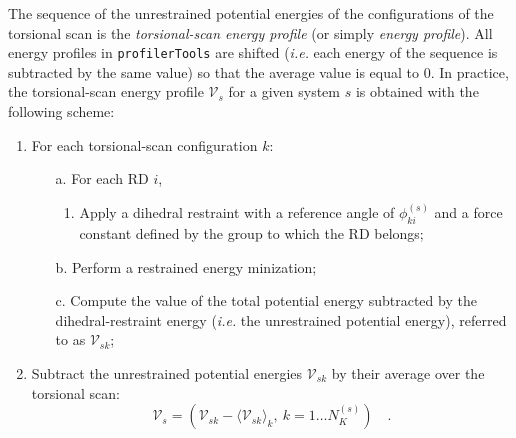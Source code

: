 \documentclass[10pt,a4paper,openany]{memoir}
\numberwithin{equation}{section}
\newcommand{\profilertools}[0]{\texttt{profilerTools}}
\begin{document}
The sequence of the unrestrained potential energies of the
configurations of the torsional scan is the \textit{torsional-scan
  energy profile} (or simply \textit{energy profile}).  All energy
profiles in \profilertools{} are shifted (\textit{i.e.} each energy of
the sequence is subtracted by the same value) so that the average
value is equal to 0.
In practice, the torsional-scan energy profile $\mathcal{V}_s$ for a
given system $s$ is obtained with the following scheme:
\begin{enumerate}
\item For each torsional-scan configuration $k$:
  \begin{enumerate}
  \item[a.] For each RD $i$,
    \begin{enumerate}
    \item Apply a dihedral restraint with a reference angle of
      $\phi_{ki}^{(s)}$ and a force constant defined by the group to
      which the RD belongs;
  \end{enumerate}
\item [b.] Perform a restrained energy minization;
  \item [c.] Compute the value of the total potential energy
    subtracted by the dihedral-restraint energy (\textit{i.e.} the
    unrestrained potential energy), referred to as $\mathcal{V}_{sk}$;
\end{enumerate}
\item Subtract the unrestrained potential energies
  $\mathcal{V}_{sk}$ by their average over the torsional scan:
  \begin{equation}
  \label{eq:ga-tors-scan}
  \mathcal{V}_s = \left( \mathcal{V}_{sk} - \langle {\mathcal{V}_{sk} \rangle_k},\ k=1\ldots N_K^{(s)} \right) \quad .
\end{equation}
\end{enumerate}
\end{document}
